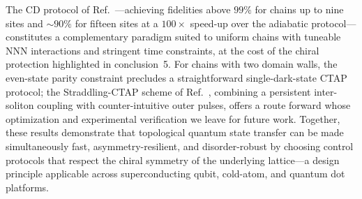 \documentclass[
  reprint,
  amsmath,
  amssymb,
  aps,
  prb,
  floatfix,
  longbibliography,
]{revtex4-2}
\begin{document}
The CD protocol of Ref.~\cite{Romero2024}---achieving fidelities above $99\%$
for chains up to nine sites and $\sim\!90\%$ for fifteen sites at a
$100\times$ speed-up over the adiabatic protocol---constitutes a complementary
paradigm suited to uniform chains with tuneable NNN interactions and stringent
time constraints, at the cost of the chiral protection highlighted in
conclusion~5.
For chains with two domain walls, the even-state parity constraint precludes
a straightforward single-dark-state CTAP protocol; the Straddling-CTAP scheme
of Ref.~\cite{Greentree2004}, combining a persistent inter-soliton coupling
with counter-intuitive outer pulses, offers a route forward whose optimization
and experimental verification we leave for future work.
Together, these results demonstrate that topological quantum state transfer
can be made simultaneously fast, asymmetry-resilient, and disorder-robust by
choosing control protocols that respect the chiral symmetry of the underlying
lattice---a design principle applicable across superconducting qubit,
cold-atom, and quantum dot platforms.


\end{document}
